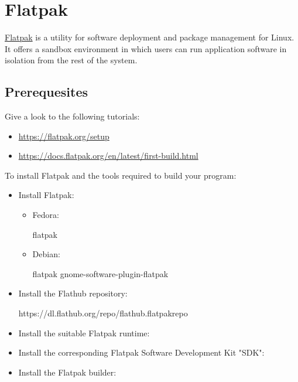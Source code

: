\section{Flatpak}

\href{https://flatpak.org}{Flatpak} is a utility for software deployment and package management for Linux. \\
It offers a sandbox environment in which users can run application software in isolation from the rest of the system. 

\subsection{Prerequesites}

Give a look to the following tutorials:
\begin{itemize}
\item \href{https://flatpak.org/setup}{https://flatpak.org/setup}
\item \href{https://docs.flatpak.org/en/latest/first-build.html}{https://docs.flatpak.org/en/latest/first-build.html}
\end{itemize}
To install Flatpak and the tools required to build your program:
\begin{itemize}
\item Install Flatpak: 
\begin{itemize}
\item Fedora: 
{\footnotesize{
\begin{scriptii}
\fprompt{~}    flatpak
\end{scriptii}
}}
\item Debian:
{\footnotesize{
\begin{scriptii}
\uprompt{~}    flatpak
\uprompt{~}    gnome-software-plugin-flatpak
\end{scriptii}
}}
\end{itemize}
\item Install the Flathub repository: 
{\scriptsize{
\begin{scripti}
   https://dl.flathub.org/repo/flathub.flatpakrepo
\end{scripti}
}}
\item Install the suitable Flatpak runtime:
{\footnotesize{
\begin{scripti}
   
\end{scripti}
}}
\item Install the corresponding Flatpak Software Development Kit "SDK":
{\footnotesize{
\begin{scripti}
   
\end{scripti}
}}
\item Install the Flatpak builder:
{\footnotesize{
\begin{scripti}
   
\end{scripti}
}}
\end{itemize}

